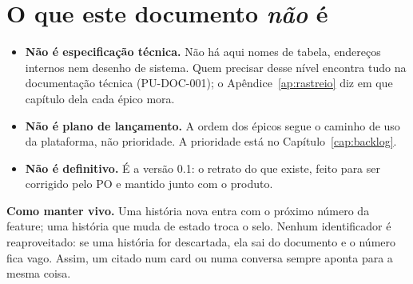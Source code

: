 \section{O que este documento \emph{não} é}

\begin{itemize}
  \item \textbf{Não é especificação técnica.} Não há aqui nomes de tabela,
    endereços internos nem desenho de sistema. Quem precisar desse nível
    encontra tudo na documentação técnica (PU-DOC-001); o
    Apêndice~\ref{ap:rastreio} diz em que capítulo dela cada épico mora.
  \item \textbf{Não é plano de lançamento.} A ordem dos épicos segue o caminho
    de uso da plataforma, não prioridade. A prioridade está no
    Capítulo~\ref{cap:backlog}.
  \item \textbf{Não é definitivo.} É a versão 0.1: o retrato do que existe,
    feito para ser corrigido pelo PO e mantido junto com o produto.
\end{itemize}

\begin{nota}
\textbf{Como manter vivo.} Uma história nova entra com o próximo número da
feature; uma história que muda de estado troca o selo. Nenhum identificador é
reaproveitado: se uma história for descartada, ela sai do documento e o número
fica vago. Assim, um  citado num card ou numa conversa sempre aponta
para a mesma coisa.
\end{nota}
